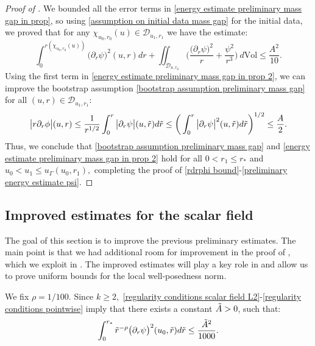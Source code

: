 \documentclass[11pt]{article}
\numberwithin{equation}{section}
\begin{document}
\begin{proof}[Proof of ]
We bounded all the error terms in \eqref{energy estimate preliminary mass gap in prop}, so using \eqref{assumption on initial data mass gap} for the initial data, we proved that for any $\chi_{u_0,r_0}(u)\in\mathcal{D}_{u_1,r_1}$ we have the estimate:
\begin{equation}\label{energy estimate preliminary mass gap in prop 2}
    \int_0^{r(\chi_{u_0,r_0}(u))}\big(\partial_r\psi\big)^2(u,r)dr+\iint_{\mathcal{D}_{u,r_0}}\bigg(\frac{\big(\partial_r\psi\big)^2}{r}+\frac{\psi^2}{r^3}\bigg)\ d\mathrm{Vol}\leq\frac{A^2}{10}.
\end{equation}
Using the first term in \eqref{energy estimate preliminary mass gap in prop 2}, we can  improve the bootstrap assumption \eqref{bootstrap assumption preliminary mass gap} for all $(u,r)\in\mathcal{D}_{u_1,r_1}$:
\[\big|r\partial_r\phi\big|(u,r)\leq\frac{1}{r^{1/2}}\int_0^r\big|\partial_r\psi\big|(u,\Tilde{r})d\Tilde{r}\leq\bigg(\int_0^r\big|\partial_r\psi\big|^2(u,\Tilde{r})d\Tilde{r}\bigg)^{1/2}\leq\frac{A}{2}.\]
Thus, we conclude that \eqref{bootstrap assumption preliminary mass gap} and \eqref{energy estimate preliminary mass gap in prop 2} hold for all $0<r_1\leq r_*$ and $u_0<u_1\leq u_{\Gamma}(u_0,r_1),$ completing the proof of \eqref{rdrphi bound}-\eqref{preliminary energy estimate psi}. 
\end{proof}

\subsection{Improved estimates for the scalar field}\label{improved scalar field section}
The goal of this section is to improve the previous preliminary estimates. The main point is that we had additional room for improvement in the proof of , which we exploit in . The improved estimates will play a key role in  and allow us to prove uniform bounds for the local well-posedness norm.

We fix $\rho=1/100.$ Since $k\geq2,$ \eqref{regularity conditions scalar field L2}-\eqref{regularity conditions pointwise} imply that there exists a constant $\Tilde{A}>0$, such that:
\begin{equation}\label{assumption on initial data mass gap improved}
    \int_0^{r_*}\Tilde{r}^{-\rho}\big(\partial_r\psi\big)^2(u_0,\Tilde{r})d\Tilde{r}\leq\frac{\Tilde{A}^2}{1000}.
\end{equation}
\end{document}
